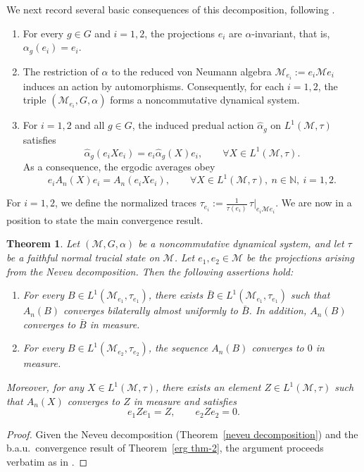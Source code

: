 \documentclass[11pt]{amsart}
\newtheorem{thm}{Theorem}[section]
\theoremstyle{definition}
\theoremstyle{myremark}
\numberwithin{equation}{section}
\def\N{\mathbb N}
\newcommand{\CM}{\mathcal{M}}
\begin{document}
We next record several basic consequences of this decomposition, following \cite{Bik-Dip-neveu}.

\begin{enumerate}
	\item For every $g \in G$ and $i = 1,2$, the projections $e_i$ are $\alpha$-invariant, that is, $\alpha_g(e_i) = e_i$.
	\item The restriction of $\alpha$ to the reduced von Neumann algebra $\CM_{e_i} := e_i \CM e_i$ induces an action by automorphisms. Consequently, for each $i=1,2$, the triple $(\CM_{e_i}, G, \alpha)$ forms a noncommutative dynamical system.
	\item For $i = 1,2$ and all $g \in G$, the induced predual action $\hat{\alpha}_g$ on $L^1(\CM,\tau)$ satisfies
	\[
		\hat{\alpha}_g(e_i X e_i)
		= e_i \hat{\alpha}_g(X) e_i,
		\qquad \forall X \in L^1(\CM,\tau).
	\]
	As a consequence, the ergodic averages obey
	\[
		e_i A_n(X) e_i = A_n(e_i X e_i),
		\qquad \forall X \in L^1(\CM,\tau),\ n \in \N,\ i=1,2.
	\]
\end{enumerate}

For $i=1,2$, we define the normalized traces $\tau_{e_i} := \frac{1}{\tau(e_i)}\, \tau|_{e_i \CM e_i}$. We are now in a position to state the main convergence result.

\begin{thm}\label{conv in e1-e2 corner}
	Let $(\CM, G, \alpha)$ be a noncommutative dynamical system, and let $\tau$ be a faithful normal tracial state on $\CM$. Let $e_1, e_2 \in \CM$ be the projections arising from the Neveu decomposition. Then the following assertions hold:
	\begin{enumerate}
		\item[(i)] For every $B \in L^1(\CM_{e_1}, \tau_{e_1})$, there exists $\bar{B} \in L^1(\CM_{e_1}, \tau_{e_1})$ such that $A_n(B)$ converges bilaterally almost uniformly to $\bar{B}$. In addition, $A_n(B)$ converges to $\bar{B}$ in measure.
		\item[(ii)] For every $B \in L^1(\CM_{e_2}, \tau_{e_2})$, the sequence $A_n(B)$ converges to $0$ in measure.
	\end{enumerate}
	Moreover, for any $X \in L^1(\CM,\tau)$, there exists an element $Z \in L^1(\CM,\tau)$ such that $A_n(X)$ converges to $Z$ in measure and satisfies
	\[
		e_1 Z e_1 = Z, \qquad e_2 Z e_2 = 0.
	\]
\end{thm}

\begin{proof}
	Given the Neveu decomposition (Theorem~\ref{neveu decomposition}) and the b.a.u.\ convergence result of Theorem~\ref{erg thm-2}, the argument proceeds verbatim as in \cite[Section~5]{Bik-Dip-neveu}.
\end{proof}
\end{document}
